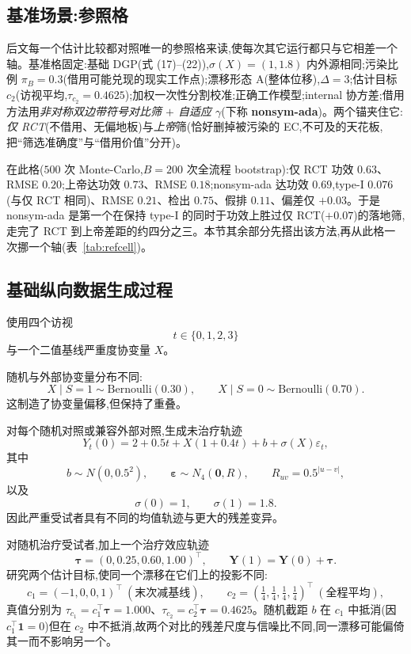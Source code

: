 \documentclass[11pt]{article}
\begin{document}
\subsection{基准场景:参照格}\label{sec:basecell}

后文每一个估计比较都对照唯一的参照格来读,使每次其它运行都只与它相差一个轴。基准格固定:基础 DGP(式 (17)--(22)),$\sigma(X){=}(1,1.8)$ 内外源相同;污染比例 $\pi_B{=}0.3$(借用可能兑现的现实工作点);漂移形态 A(整体位移),$\Delta{=}3$;估计目标 $c_2$(访视平均,$\tau_{c_2}{=}0.4625$);加权一次性分割校准;正确工作模型;internal 协方差;借用方法用\emph{非对称双边带符号对比筛 $+$ 自适应 $\gamma$}(下称 \textbf{nonsym-ada})。两个锚夹住它:\emph{仅 RCT}(不借用、无偏地板)与\emph{上帝}筛(恰好删掉被污染的 EC,不可及的天花板,把``筛选准确度''与``借用价值''分开)。

在此格($500$ 次 Monte-Carlo,$B{=}200$ 次全流程 bootstrap):仅 RCT 功效 $0.63$、RMSE $0.20$;上帝达功效 $0.73$、RMSE $0.18$;nonsym-ada 达功效 $0.69$,type-I $0.076$(与仅 RCT 相同)、RMSE $0.21$、检出 $0.75$、假排 $0.11$、偏差仅 $+0.03$。于是 nonsym-ada 是第一个在保持 type-I 的同时于功效上胜过仅 RCT($+0.07$)的落地筛,走完了 RCT 到上帝差距的约四分之三。本节其余部分先搭出该方法,再从此格一次挪一个轴(表~\ref{tab:refcell})。

\subsection{基础纵向数据生成过程}

使用四个访视
\[
t\in\{0,1,2,3\}
\]
与一个二值基线严重度协变量 $X$。

随机与外部协变量分布不同:
\[
X\mid S=1\sim\mathrm{Bernoulli}(0.30),
\qquad
X\mid S=0\sim\mathrm{Bernoulli}(0.70).
\tag{17}
\]
这制造了协变量偏移,但保持了重叠。

对每个随机对照或兼容外部对照,生成未治疗轨迹
\[
Y_t(0)
=
2+0.5t+X(1+0.4t)+b+\sigma(X)\varepsilon_t,
\tag{18}
\]
其中
\[
b\sim N(0,0.5^2),
\qquad
\bm\varepsilon\sim N_4(\bm 0,R),
\qquad
R_{uv}=0.5^{|u-v|},
\]
以及
\[
\sigma(0)=1,
\qquad
\sigma(1)=1.8.
\tag{19}
\]
因此严重受试者具有不同的均值轨迹与更大的残差变异。

对随机治疗受试者,加上一个治疗效应轨迹
\[
\bm\tau=(0,0.25,0.60,1.00)^{\top},
\qquad
\bm Y(1)=\bm Y(0)+\bm\tau.
\tag{20}
\]
研究两个估计目标,使同一个漂移在它们上的投影不同:
\[
c_1=(-1,0,0,1)^{\top}\ (\text{末次减基线}),
\qquad
c_2=(\tfrac14,\tfrac14,\tfrac14,\tfrac14)^{\top}\ (\text{全程平均}),
\tag{21}
\]
真值分别为 $\tau_{c_1}=c_1^{\top}\bm\tau=1.000$、$\tau_{c_2}=c_2^{\top}\bm\tau=0.4625$。随机截距 $b$ 在 $c_1$ 中抵消(因 $c_1^{\top}\bm 1=0$)但在 $c_2$ 中不抵消,故两个对比的残差尺度与信噪比不同,同一漂移可能偏倚其一而不影响另一个。
\end{document}
